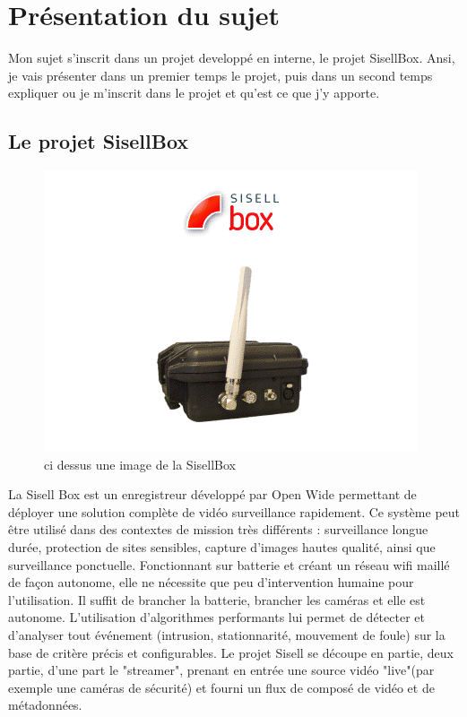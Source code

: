 \chapter{Présentation du sujet}
Mon sujet s'inscrit dans un projet developpé en interne, le projet SisellBox. Ansi,
je vais présenter dans un premier temps le projet, puis dans un second temps
expliquer ou je m'inscrit dans le projet et qu'est ce que j'y apporte.



\section{Le projet SisellBox}
\label{sisselbox}

\begin{figure}[!h]
  \centering
  \includegraphics[scale=0.7]{figures/sbox}
  \caption{ci dessus une image de la SisellBox}
\end{figure}
\newpage
La Sisell Box est un enregistreur développé par Open Wide permettant de déployer une solution complète de vidéo surveillance rapidement.
Ce système peut être utilisé dans des contextes de mission très différents : surveillance longue durée, protection de sites sensibles, capture d'images hautes qualité, ainsi que surveillance ponctuelle.
Fonctionnant sur batterie et créant un réseau wifi maillé de façon autonome, elle ne nécessite que peu d'intervention humaine pour l'utilisation. Il suffit de brancher la batterie, brancher les caméras et elle est autonome. L'utilisation d'algorithmes performants lui permet de détecter et d'analyser tout événement (intrusion, stationnarité, mouvement de foule) sur la base de critère précis et configurables. Le projet Sisell se découpe en partie, deux partie, d'une part le "streamer", prenant en entrée une source vidéo "live"(par exemple une caméras de sécurité) et fourni un flux de composé de vidéo et de métadonnées.



